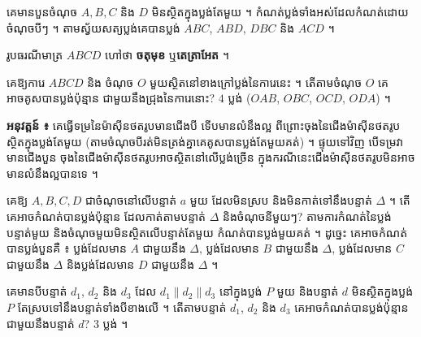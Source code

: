 \begin{example}[លំហាត់គំរូ ១]
គេមានបួនចំណុច $A, B, C$ និង $D$ មិនស្ថិតក្នុងប្លង់តែមួយ ។ កំណត់ប្លង់ទាំងអស់ដែលកំណត់ដោយចំណុចបីៗ ។
\ans
តាមស្វ័យសត្យប្លង់គេបានប្លង់ $ABC$, $ABD$, $DBC$ និង $ACD$ ។
\end{example}
\begin{note}[សម្គាល់]
រូបធរណីមាត្រ $ABCD$ ហៅថា \textbf{ចតុមុខ} ឬ\textbf{តេត្រាអែត} ។
\end{note}
\begin{center}
\end{center}

\begin{pro}
គេឱ្យការេ $ABCD$ និង ចំណុច $O$ មួយស្ថិតនៅខាងក្រៅប្លង់នៃការេនេះ ។ តើតាមចំណុច $O$ គេអាចគូសបានប្លង់ប៉ុន្មាន ជាមួយនឹងជ្រុងនៃការេនោះ?
\ans
$4$ ប្លង់ ($OAB$, $OBC$, $OCD$, $ODA$) ។
\end{pro}

\textbf{អនុវត្តន៍ ៖} គេធ្វើទម្រនៃម៉ាស៊ីនថតរូបមានជើងបី ទើបមានលំនឹងល្អ ពីព្រោះចុងនៃជើងម៉ាស៊ីនថតរូបស្ថិតក្នុងប្លង់តែមួយ (តាមចំណុចបីរត់មិនត្រង់គ្នាគេគូសបានប្លង់តែមួយគត់) ។ ផ្ទុយទៅវិញ បើទម្រវាមានជើងបួន ចុងនៃជើងម៉ាស៊ីនថតរូបអាចស្ថិតនៅលើប្លង់ច្រើន ក្នុងករណីនេះជើងម៉ាស៊ីនថតរូបមិនអាចមានលំនឹងល្អបានទេ ។

\begin{example}[លំហាត់គំរូ ២]
គេឱ្យ $A, B, C, D$ ជាចំណុចនៅលើបន្ទាត់ $a$ មួយ ដែលមិនស្រប និងមិនកាត់ទៅនឹងបន្ទាត់ $\Delta$ ។ តើគេអាចកំណត់បានប្លង់ប៉ុន្មាន ដែលកាត់តាមបន្ទាត់ $\Delta$ និងចំណុចនីមួយៗ?
\ans
តាមការកំណត់នៃប្លង់ បន្ទាត់មួយ និងចំណុចមួយមិនស្ថិតលើបន្ទាត់តែមួយ កំណត់បានប្លង់មួយគត់ ។ ដូច្នេះ គេអាចកំណត់បានប្លង់បួនគឺ ៖ ប្លង់ដែលមាន $A$ ជាមួយនឹង $\Delta$, ប្លង់ដែលមាន $B$ ជាមួយនឹង $\Delta$, ប្លង់ដែលមាន $C$ ជាមួយនឹង $\Delta$ និងប្លង់ដែលមាន $D$ ជាមួយនឹង $\Delta$ ។
\end{example}

\begin{pro}
គេមានបីបន្ទាត់ $d_1$, $d_2$ និង $d_3$ ដែល $d_1 \parallel d_2 \parallel d_3$ នៅក្នុងប្លង់ $P$ មួយ និងបន្ទាត់ $d$ មិនស្ថិតក្នុងប្លង់ $P$ តែស្របទៅនឹងបន្ទាត់ទាំងបីខាងលើ ។ តើតាមបន្ទាត់ $d_1$, $d_2$ និង $d_3$ គេអាចកំណត់បានប្លង់ប៉ុន្មានជាមួយនឹងបន្ទាត់ $d$?
\ans
$3$ ប្លង់ ។
\end{pro}

